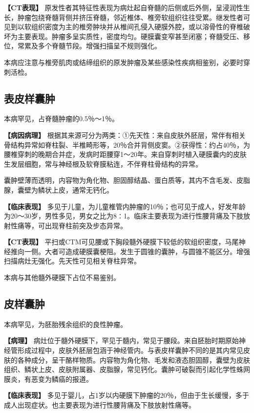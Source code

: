 \textbf{【CT表现】}
原发性者其特征性表现为病灶起自脊髓的后侧或后外侧，呈浸润性生长，肿瘤包绕脊髓背侧并挤压脊髓，邻近椎体、椎旁软组织往往受累。继发性者可见到以软组织密度为主的椎旁肿块并从椎间孔侵入硬膜外腔，或以溶骨性的脊椎破坏为主要表现。肿瘤多呈实质性，密度均匀。硬膜囊变窄甚至闭塞；脊髓受压、移位，常累及多个脊髓节段。增强扫描呈不规则强化。

本病应注意与椎旁肌肉或结缔组织的原发肿瘤及某些感染性疾病相鉴别，必要时穿刺活检。

\subsection{表皮样囊肿}

本病罕见，占脊髓肿瘤的0.5％～1％。

\textbf{【病因病理】}
根据其来源可分为两类：①先天性：来自皮肤外胚层，常伴有相关骨结构异常如脊柱裂、半椎畸形等，20％合并背侧皮窦。②获得性：约占40％，为腰椎穿刺的晚期合并症，发病时距腰穿1～20年。来自穿刺时植入硬膜囊内的皮肤生发层细胞，常与神经根及软脊膜粘连，不伴脊柱骨结构的异常。

囊肿壁薄而透明，内容物为角化物、胆固醇结晶、蛋白质等，其内不含毛发、皮脂腺，囊壁为鳞状上皮，通常无钙化。

\textbf{【临床表现】}
多见于儿童，为儿童椎管内肿瘤的10％；也可见于成人，好发年龄为20～30岁，男性多见，男女之比为8∶1。临床主要表现为进行性腰背痛及下肢放射性痛等，可出现脊柱前突及步态异常。

\textbf{【CT表现】}
平扫或CTM可见腰或下胸段髓外硬膜下较低的软组织密度，马尾神经推向一侧。大者可造成硬膜囊梗阻。发生于圆锥的囊肿，与圆锥不能区分。增强扫描病灶无强化。先天性可见相关脊柱异常。

本病与其他髓外硬膜下占位不易鉴别。

\subsection{皮样囊肿}

本病罕见，为胚胎残余组织的良性肿瘤。

\textbf{【病理】}
病灶位于髓外硬膜下，罕见于髓内，常见于腰段。来自胚胎时期原始神经管形成过程中，皮肤外胚层包涵于神经管内。与表皮样囊肿不同的是其内常见皮肤的各种成分，呈干酪样物质。内容物为角化物、毛发和液态胆固醇，囊壁为皮肤组织、鳞状上皮、皮肤附属器、皮脂腺，常见钙化。囊肿可破裂而引起化学性蛛网膜炎，有恶变为鳞癌的报道。

\textbf{【临床表现】}
多见于婴儿，占1岁以内硬膜下肿瘤的20％，但由于生长缓慢，多于成人出现症状。也主要表现为进行性腰背痛及下肢放射性痛等。

